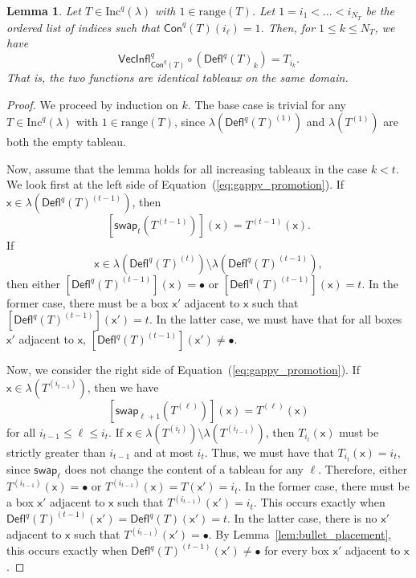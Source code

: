 \documentclass[12pt]{amsart}
\newcommand{\x}{\ensuremath{\mathsf{x}}}
\newtheorem{lemma}[theorem]{Lemma}
\theoremstyle{definition}
\theoremstyle{remark}
\numberwithin{equation}{section}
\renewcommand{\emptyset}{\varnothing}
\newcommand{\inc}{\ensuremath{\mathrm{Inc}}}
\newcommand{\swap}{\ensuremath{\mathsf{swap}}}
\newcommand{\rep}{\ensuremath{\mathsf{Rep}}}
\newcommand{\deflate}{\ensuremath{\mathsf{Defl}}}
\newcommand{\inflate}{\ensuremath{\mathsf{VecInfl}}}
\newcommand{\content}{\ensuremath{\mathsf{Con}}}
\begin{document}
\begin{lemma} \label{lem:gappy_promotion}
Let $T \in \inc^q(\lambda)$ with $1 \in \mathrm{range}(T)$. Let $1 = i_1 < \dots < i_{N_T}$ be the ordered list of indices such that $\content^q(T)(i_\ell) = 1$.  Then, for $1 \leq k \leq N_T$, we have
\begin{equation}\label{eq:gappy_promotion}
 \inflate^q_{\content^q(T)} \circ (\deflate^q(T)_k) = T_{i_k}. 
\end{equation}
 That is, the two functions are identical tableaux on the same domain. 
\end{lemma}

\begin{proof}  We proceed by induction on $k$. The base case is trivial for any $T \in \inc^q(\lambda)$  with $1 \in \mathrm{range}(T)$, since $\lambda(\deflate^q(T)^{(1)})$ and $\lambda(T^{(1)})$ are both the empty tableau.

Now, assume that the lemma holds for all increasing tableaux in the case $k < t$. We look first at the left side of Equation~(\ref{eq:gappy_promotion}). If $\x \in \lambda \left( \deflate^q(T)^{(t-1)} \right)$, then 
\[
[\swap_{t}(T^{(t-1)})](\x) = T^{(t-1)}(\x).
\]
 If 
 \[\x \in \lambda(\deflate^q(T)^{(t)}) \setminus \lambda(\deflate^q(T)^{(t-1)}),\]
  then either $[\deflate^q(T)^{(t-1)}](\x) = \bullet$ or $[\deflate^q(T)^{(t-1)}](\x) = t$. In the former case, there must be a box $\x'$ adjacent to $\x$ such that $[\deflate^q(T)^{(t-1)}](\x') = t$. In the latter case, we must have that for all boxes $\x'$ adjacent to $\x$, $[\deflate^q(T)^{(t-1)}](\x') \neq \bullet$. 

Now, we consider the right side of Equation~(\ref{eq:gappy_promotion}). If $\x \in \lambda \left(T^{(i_{t-1})} \right)$, then we have
\[
\left[ \swap_{\ell+1} \left(T^{(\ell)} \right) \right](\x) = T^{(\ell)}(\x)
\]
 for all $i_{t-1} \leq \ell \leq i_t$. If $\x \in \lambda \left(T^{(i_{t})} \right) \setminus \lambda \left(T^{(i_{t-1})} \right)$, then $T_{i_{t}}(\x)$ must be strictly greater than $i_{t-1}$ and at most $i_{t}$. Thus, we must have that $T_{i_{t}}(\x) = i_{t}$, since $\swap_\ell$ does not change the content of a tableau for any $\ell$. Therefore, either $T^{(i_{t-1})}(\x) = \bullet$ or $T^{(i_{t-1})}(\x) =  T(\x') = i_{t}$. In the former case, there must be a box $\x'$ adjacent to $\x$ such that $T^{(i_{t-1})}(\x') = i_{t}$. This occurs exactly when $\deflate^q(T)^{(t-1)}(\x') = \deflate^q(T)(\x') = t$. In the latter case, there is no $\x'$ adjacent to $\x$ such that $T^{(i_{t-1})}(\x') = \bullet$. By Lemma~\ref{lem:bullet_placement}, this occurs exactly when  $\deflate^q(T)^{(t-1)}(\x') \neq \bullet$ for every box $\x'$ adjacent to $\x$.


\end{proof}
\end{document}

